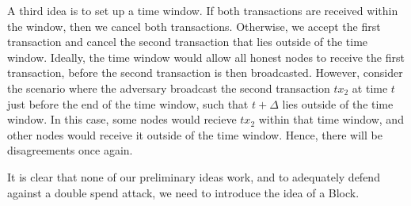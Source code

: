 A third idea is to set up a time window. If both transactions are received within the window, then we cancel both transactions. Otherwise, we accept the first transaction and cancel the second transaction that lies outside of the time window. Ideally, the time window would allow all honest nodes to receive the first transaction, before the second transaction is then broadcasted. However, consider the scenario where the adversary broadcast the second transaction $tx_2$ at time $t$ just before the end of the time window, such that $t + \Delta$ lies outside of the time window. In this case, some nodes would recieve $tx_2$ within that time window, and other nodes would receive it outside of the time window. Hence, there will be disagreements once again.

It is clear that none of our preliminary ideas work, and to adequately defend against a double spend attack, we need to introduce the idea of a Block.

